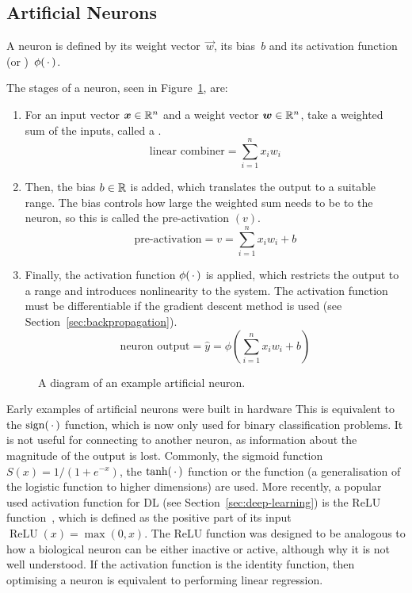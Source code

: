 \subsection{Artificial Neurons}

A neuron is defined by its weight vector~\(\vec{w}\), its bias~\(b\) and its activation function (or )~\(\phi(\,\cdot\,)\).

The stages of a neuron, seen in Figure~\ref{fig:neuron-example}, are:
\begin{enumerate}
	\item For an input vector \(\bm{x} \in \mathbb{R}^n\) and a weight vector \(\bm{w} \in \mathbb{R}^n\), take a weighted sum of the inputs, called a .
	      \[ \text{linear combiner} = \sum_{i=1}^{n}{x_i w_i} \]
	\item Then, the bias \(b \in \mathbb{R}{}\) is added, which translates the output to a suitable range.
	      The bias controls how large the weighted sum needs to be to  the neuron, so this is called the pre-activation \((v)\).
	      \[ \text{pre-activation} = v = \sum_{i=1}^{n}{x_i w_i} + b \]
	\item Finally, the activation function \(\phi(\,\cdot\,)\) is applied, which restricts the output to a range and introduces nonlinearity to the system.
	      The activation function must be differentiable if the gradient descent method is used (see Section~\ref{sec:backpropagation}).
	      \[ \text{neuron output} = \hat{y} = \phi\left(\sum_{i=1}^{n}{x_i w_i} + b \right) \]
\end{enumerate}

\begin{figure}[htbp]
	\centering
	
	\caption{A diagram of an example artificial neuron.}
	\label{fig:neuron-example}
\end{figure}


Early examples of artificial neurons were built in hardware 
This is equivalent to the \(\operatorname{sign}(\,\cdot\,)\) function, which is now only used for binary classification problems.
It is not useful for connecting to another neuron, as information about the magnitude of the output is lost.
Commonly, the sigmoid function \(S(x) = 1/(1 + e^{-x})\), the \(\tanh(\,\cdot\,)\) function or the  function (a generalisation of the logistic function to higher dimensions) are used.
More recently, a popular used activation function for \ac{DL} (see Section~\ref{sec:deep-learning}) is the \ac{ReLU} function~\autocite{ramachandran2017}, which is defined as the positive part of its input \(\operatorname{ReLU}(x) = \max(0, x)\).
The \ac{ReLU} function was designed to be analogous to how a biological neuron can be either inactive or active, although why it  is not well understood.
If the activation function is the identity function, then optimising a neuron is equivalent to performing linear regression.

